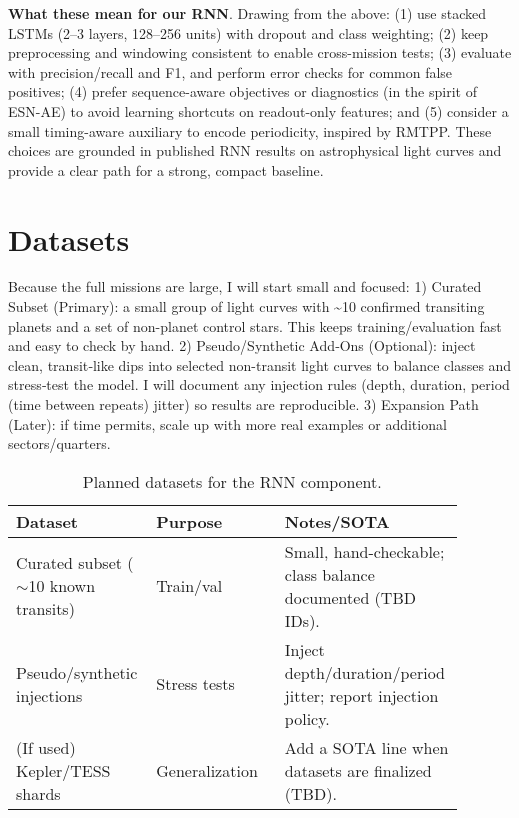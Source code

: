 \documentclass[letterpaper]{article}
\begin{document}
\noindent\textbf{What these mean for our RNN}. 
Drawing from the above: (1) use stacked LSTMs (2--3 layers, 128--256 units) with dropout and class weighting; (2) keep preprocessing and windowing consistent to enable cross-mission tests; (3) evaluate with precision/recall and F1, and perform error checks for common false positives; (4) prefer sequence-aware objectives or diagnostics (in the spirit of ESN-AE) to avoid learning shortcuts on readout-only features; and (5) consider a small timing-aware auxiliary to encode periodicity, inspired by RMTPP. 
These choices are grounded in published RNN results on astrophysical light curves and provide a clear path for a strong, compact baseline.

\section{Datasets}
Because the full missions are large, I will start small and focused:
1) Curated Subset (Primary): a small group of light curves with \textasciitilde{}10 confirmed transiting planets and a set of non-planet control stars. This keeps training/evaluation fast and easy to check by hand.
2) Pseudo/Synthetic Add‑Ons (Optional): inject clean, transit‑like dips into selected non-transit light curves to balance classes and stress‑test the model. I will document any injection rules (depth, duration, period (time between repeats) jitter) so results are reproducible.
3) Expansion Path (Later): if time permits, scale up with more real examples or additional sectors/quarters.

\begin{table}[t]
\centering
\begin{tabular}{p{0.28\linewidth} p{0.28\linewidth} p{0.33\linewidth}}
\hline
\textbf{Dataset} & \textbf{Purpose} & \textbf{Notes/SOTA} \\ \hline
Curated subset ($\sim$10 known transits) & Train/val & Small, hand-checkable; class balance documented (TBD IDs). \\
Pseudo/synthetic injections & Stress tests & Inject depth/duration/period jitter; report injection policy. \\
(If used) Kepler/TESS shards & Generalization & Add a SOTA line when datasets are finalized (TBD). \\ \hline
\end{tabular}
\caption{{Planned datasets for the RNN component.}}
\label{{tab:datasets}}
\end{table}
\end{document}
